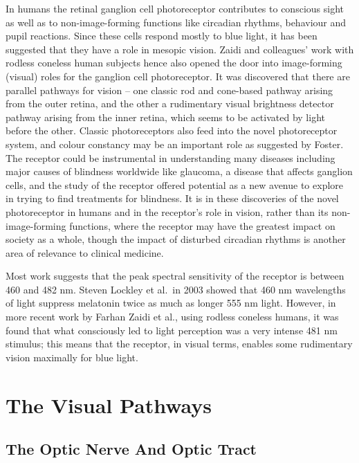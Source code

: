 In humans the retinal ganglion cell photoreceptor contributes to conscious sight as well as to non-image-forming functions like circadian rhythms, behaviour and pupil reactions. Since these cells respond mostly to blue light, it has been suggested that they have a role in mesopic vision. Zaidi and colleagues' work with rodless coneless human subjects hence also opened the door into image-forming (visual) roles for the ganglion cell photoreceptor. It was discovered that there are parallel pathways for vision -- one classic rod and cone-based pathway arising from the outer retina, and the other a rudimentary visual brightness detector pathway arising from the inner retina, which seems to be activated by light before the other. Classic photoreceptors also feed into the novel photoreceptor system, and colour constancy may be an important role as suggested by Foster. The receptor could be instrumental in understanding many diseases including major causes of blindness worldwide like glaucoma, a disease that affects ganglion cells, and the study of the receptor offered potential as a new avenue to explore in trying to find treatments for blindness. It is in these discoveries of the novel photoreceptor in humans and in the receptor's role in vision, rather than its non-image-forming functions, where the receptor may have the greatest impact on society as a whole, though the impact of disturbed circadian rhythms is another area of relevance to clinical medicine.

Most work suggests that the peak spectral sensitivity of the receptor is between 460 and 482 nm. Steven Lockley et al.~in 2003 showed that 460 nm wavelengths of light suppress melatonin twice as much as longer 555 nm light. However, in more recent work by Farhan Zaidi et al., using rodless coneless humans, it was found that what consciously led to light perception was a very intense 481 nm stimulus; this means that the receptor, in visual terms, enables some rudimentary vision maximally for blue light.

\hypertarget{the-visual-pathways}{%
\section{The Visual Pathways}\label{the-visual-pathways}}

\hypertarget{the-optic-nerve-and-optic-tract}{%
\subsection{The Optic Nerve And Optic Tract}\label{the-optic-nerve-and-optic-tract}}

